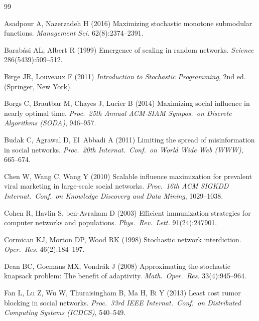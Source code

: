 \documentclass[11pt]{article}
\theoremstyle{definition}
\theoremstyle{remark}
\begin{document}
\begin{thebibliography}{99}
\providecommand{\natexlab}[1]{#1}
\providecommand{\url}[1]{\texttt{#1}}
\providecommand{\urlprefix}{URL }

Asadpour A, Nazerzadeh H (2016) Maximizing stochastic monotone submodular
  functions. \emph{Management Sci.} 62(8):2374--2391.

Barab\'asi AL, Albert R (1999) Emergence of scaling in random networks.
  \emph{Science} 286(5439):509--512.

Birge JR, Louveaux F (2011) \emph{Introduction to Stochastic Programming}, 2nd
  ed. (Springer, New York).

Borgs C, Brautbar M, Chayes J, Lucier B (2014) Maximizing social influence in
  nearly optimal time. \emph{Proc.\ 25th Annual ACM-SIAM Sympos.\ on Discrete
  Algorithms (SODA)}, 946--957.

Budak C, Agrawal D, El~Abbadi A (2011) Limiting the spread of misinformation
  in social networks. \emph{Proc.\ 20th Internat.\ Conf.\ on World Wide Web
  (WWW)}, 665--674.

Chen W, Wang C, Wang Y (2010) Scalable influence maximization for prevalent
  viral marketing in large-scale social networks. \emph{Proc.\ 16th ACM SIGKDD
  Internat.\ Conf.\ on Knowledge Discovery and Data Mining}, 1029--1038.

Cohen R, Havlin S, ben-Avraham D (2003) Efficient immunization strategies for
  computer networks and populations. \emph{Phys.\ Rev.\ Lett.} 91(24):247901.

Cormican KJ, Morton DP, Wood RK (1998) Stochastic network interdiction.
  \emph{Oper.\ Res.} 46(2):184--197.

Dean BC, Goemans MX, Vondr\'ak J (2008) Approximating the stochastic
  knapsack problem: The benefit of adaptivity. \emph{Math.\ Oper.\ Res.}
  33(4):945--964.

Fan L, Lu Z, Wu W, Thuraisingham B, Ma H, Bi Y (2013) Least cost rumor
  blocking in social networks. \emph{Proc.\ 33rd IEEE Internat.\ Conf.\ on
  Distributed Computing Systems (ICDCS)}, 540--549.


\end{thebibliography}
\end{document}
